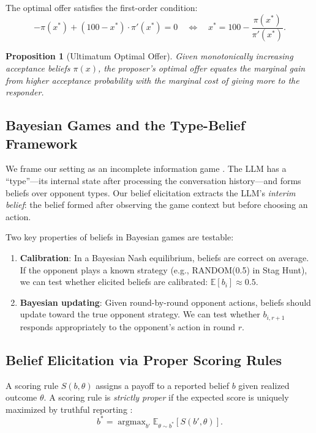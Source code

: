 \documentclass[12pt]{article}
\newtheorem{proposition}{Proposition}
\newcommand{\E}{\mathbb{E}}
\newcommand{\argmax}{\operatorname{argmax}}
\begin{document}
The optimal offer satisfies the first-order condition:
\begin{equation}
    -\pi(x^*) + (100 - x^*) \cdot \pi'(x^*) = 0 \quad \Longleftrightarrow \quad x^* = 100 - \frac{\pi(x^*)}{\pi'(x^*)}.
    \label{eq:ultimatum_foc}
\end{equation}

\begin{proposition}[Ultimatum Optimal Offer]
\label{prop:ultimatum_opt}
Given monotonically increasing acceptance beliefs $\pi(x)$, the proposer's optimal offer equates the marginal gain from higher acceptance probability with the marginal cost of giving more to the responder.
\end{proposition}


\subsection{Bayesian Games and the Type-Belief Framework}
\label{sec:bayesian_games}

We frame our setting as an incomplete information game \citep{harsanyi1967games}. The LLM has a ``type''---its internal state after processing the conversation history---and forms beliefs over opponent types. Our belief elicitation extracts the LLM's \emph{interim belief}: the belief formed after observing the game context but before choosing an action.

Two key properties of beliefs in Bayesian games are testable:
\begin{enumerate}[nosep]
    \item \textbf{Calibration}: In a Bayesian Nash equilibrium, beliefs are correct on average. If the opponent plays a known strategy (e.g., RANDOM(0.5) in Stag Hunt), we can test whether elicited beliefs are calibrated: $\E[b_i] \approx 0.5$.
    \item \textbf{Bayesian updating}: Given round-by-round opponent actions, beliefs should update toward the true opponent strategy. We can test whether $b_{i,r+1}$ responds appropriately to the opponent's action in round $r$.
\end{enumerate}


\subsection{Belief Elicitation via Proper Scoring Rules}
\label{sec:psr}

A scoring rule $S(b, \theta)$ assigns a payoff to a reported belief $b$ given realized outcome $\theta$. A scoring rule is \emph{strictly proper} if the expected score is uniquely maximized by truthful reporting \citep{savage1971elicitation}:
\begin{equation}
    b^* = \argmax_{b'} \E_{\theta \sim b^*}[S(b', \theta)].
    \label{eq:proper}
\end{equation}
\end{document}
